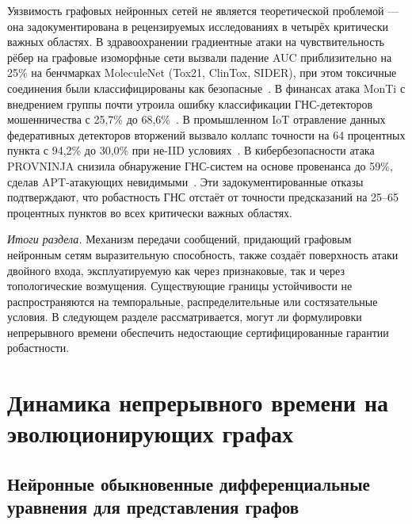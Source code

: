 Уязвимость графовых нейронных сетей не является теоретической проблемой --- она задокументирована в рецензируемых исследованиях в четырёх критически важных областях. В здравоохранении градиентные атаки на чувствительность рёбер на графовые изоморфные сети вызвали падение AUC приблизительно на 25\% на бенчмарках MoleculeNet (Tox21, ClinTox, SIDER), при этом токсичные соединения были классифицированы как безопасные~\cite{EdgeSensitivity2025}. В финансах атака MonTi с внедрением группы почти утроила ошибку классификации ГНС-детекторов мошенничества с 25,7\% до 68,6\%~\cite{MonTi2025}. В промышленном IoT отравление данных федеративных детекторов вторжений вызвало коллапс точности на 64 процентных пункта с 94,2\% до 30,0\% при не-IID условиях~\cite{FerragPoisoning2023}. В кибербезопасности атака PROVNINJA снизила обнаружение ГНС-систем на основе провенанса до 59\%, сделав APT-атакующих невидимыми~\cite{PROVNINJA2023}. Эти задокументированные отказы подтверждают, что робастность ГНС отстаёт от точности предсказаний на 25--65 процентных пунктов во всех критически важных областях.

\medskip
\noindent\textit{Итоги раздела.} Механизм передачи сообщений, придающий графовым нейронным сетям выразительную способность, также создаёт поверхность атаки двойного входа, эксплуатируемую как через признаковые, так и через топологические возмущения. Существующие границы устойчивости не распространяются на темпоральные, распределительные или состязательные условия. В следующем разделе рассматривается, могут ли формулировки непрерывного времени обеспечить недостающие сертифицированные гарантии робастности.


\section{Динамика непрерывного времени на эволюционирующих графах}
\label{sec:ct_dynamics}

\subsection{Нейронные обыкновенные дифференциальные уравнения для представления графов}

